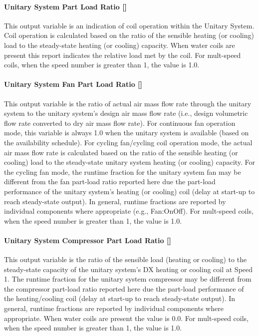 \paragraph{Unitary System Part Load Ratio {[]}}\label{unitary-system-part-load-ratio}

This output variable is an indication of coil operation within the Unitary System. Coil operation is calculated based on the ratio of the sensible heating (or cooling) load to the steady-state heating (or cooling) capacity. When water coils are present this report indicates the relative load met by the coil. For mult-speed coils, when the speed number is greater than 1, the value is 1.0.

\paragraph{Unitary System Fan Part Load Ratio {[]}}\label{unitary-system-fan-part-load-ratio}

This output variable is the ratio of actual air mass flow rate through the unitary system to the unitary system's design air mass flow rate (i.e., design volumetric flow rate converted to dry air mass flow rate). For continuous fan operation mode, this variable is always 1.0 when the unitary system is available (based on the availability schedule). For cycling fan/cycling coil operation mode, the actual air mass flow rate is calculated based on the ratio of the sensible heating (or cooling) load to the steady-state unitary system heating (or cooling) capacity. For the cycling fan mode, the runtime fraction for the unitary system fan may be different from the fan part-load ratio reported here due the part-load performance of the unitary system's heating (or cooling) coil (delay at start-up to reach steady-state output). In general, runtime fractions are reported by individual components where appropriate (e.g., Fan:OnOff). For mult-speed coils, when the speed number is greater than 1, the value is 1.0.

\paragraph{Unitary System Compressor Part Load Ratio {[]}}\label{unitary-system-compressor-part-load-ratio}

This output variable is the ratio of the sensible load (heating or cooling) to the steady-state capacity of the unitary system's DX heating or cooling coil at Speed 1. The runtime fraction for the unitary system compressor may be different from the compressor part-load ratio reported here due the part-load performance of the heating/cooling coil (delay at start-up to reach steady-state output). In general, runtime fractions are reported by individual components where appropriate. When water coils are present the value is 0.0. For mult-speed coils, when the speed number is greater than 1, the value is 1.0.

